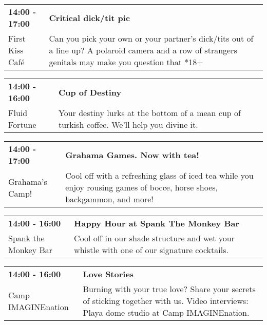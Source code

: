\begin{tabular}{ p{1in} p{2.2in} }
    \textbf{14:00 - 17:00} & \textbf{Critical dick/tit pic} \\
    First Kiss Caf\'e \newline  & Can you pick your own or your partner's dick/tits out of a line up?  A polaroid camera and a row of strangers genitals may make you question that *18+ \\
    \hline 
\end{tabular}
    
\begin{tabular}{ p{1in} p{2.2in} }
    \textbf{14:00 - 16:00} & \textbf{Cup of Destiny} \\
    Fluid Fortune \newline  & Your destiny lurks at the bottom of a mean cup of turkish coffee. We'll help you divine it. \\
    \hline 
\end{tabular}
    
\begin{tabular}{ p{1in} p{2.2in} }
    \textbf{14:00 - 17:00} & \textbf{Grahama Games. Now with tea!} \\
    Grahama's Camp! \newline  & Cool off with a refreshing glass of iced tea while you enjoy rousing games of bocce, horse shoes, backgammon, and more! \\
    \hline 
\end{tabular}
    
\begin{tabular}{ p{1in} p{2.2in} }
    \textbf{14:00 - 16:00} & \textbf{Happy Hour at Spank The Monkey Bar} \\
    Spank the Monkey Bar \newline  & Cool off in our shade structure and wet your whistle with one of our signature cocktails. \\
    \hline 
\end{tabular}
    
\begin{tabular}{ p{1in} p{2.2in} }
    \textbf{14:00 - 16:00} & \textbf{Love Stories} \\
    Camp IMAGINEnation \newline  & Burning with your true love? Share your secrets of sticking together with us. Video interviews: Playa dome studio at Camp IMAGINEnation. \\
    \hline 
\end{tabular}
    
